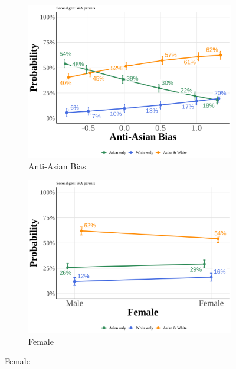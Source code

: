 \pagebreak
\newpage

\begin{center}
\begin{figure}[!htb]
\centering
\caption{Predicted Probabilities: Second Generation White Father-Asian Mother (WA)}
\label{fig:pp-second-wa}

\begin{subfigure}{.48\textwidth}
\caption{Anti-Asian Bias}
\centering
\includegraphics[width=1\linewidth]{simple_pp_value_second_wa.png}
\end{subfigure}
\hfill
\begin{subfigure}{.48\textwidth}
\caption{Female}
\centering
\includegraphics[width=1\linewidth]{simple_pp_Female_second_wa.png}
\end{subfigure}


\end{figure}
\end{center}
